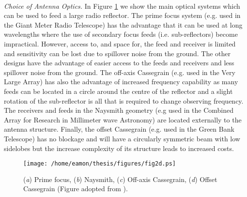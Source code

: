 \\
\textit{Choice of Antenna Optics.} In Figure \ref{fig2d} we show the main optical systems which can be used to feed a large radio reflector. The prime focus system (e.g. used in the Giant Meter Radio Telescope) has the advantage that it can be used at long wavelengths where the use of secondary focus feeds (i.e. sub-reflectors) become impractical. However, access to, and space for, the feed and receiver is limited and sensitivity can be lost due to spillover noise from the ground. The other designs have the advantage of easier access to the feeds and receivers and less spillover noise from the ground. The off-axis Cassegrain (e.g. used in the Very Large Array) has also the advantage of increased frequency capability as many feeds can be located in a circle around the centre of the reflector and a slight rotation of the sub-reflector is all that is required to change observing frequency. The receivers and feeds in the Naysmith geometry (e.g used in the Combined Array for Research in Millimeter wave Astronomy) are located externally to the antenna structure. Finally, the offset Cassegrain (e.g. used in the Green Bank Telescope) has no blockage and will have a circularly symmetric beam with low sidelobes but the increase complexity of its structure leads to increased costs. 

\begin{figure}[hbt!]
\centering 
          \texttt{[image: /home/eamon/thesis/figures/fig2d.ps]}
\caption[Common optical systems used for radio antennas.]{(\textit{a}) Prime focus, (\textit{b}) Naysmith, (\textit{c}) Off-axis Cassegrain, (\textit{d}) Offset Cassegrain (Figure adopted from \cite{taylor_1999}).}
\label{fig2d}
\end{figure}

